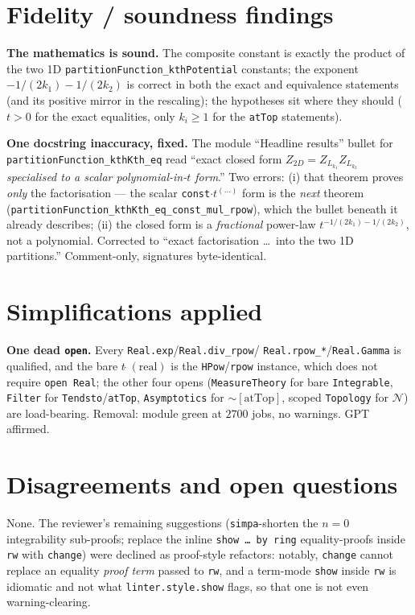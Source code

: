 \documentclass[11pt]{article}
\begin{document}
\section{Fidelity / soundness findings}
\textbf{The mathematics is sound.} The composite constant is exactly the product of the two 1D
\texttt{partitionFunction\_kthPotential} constants; the exponent $-1/(2k_1)-1/(2k_2)$ is correct in
both the exact and equivalence statements (and its positive mirror in the rescaling); the
hypotheses sit where they should ($t>0$ for the exact equalities, only $k_i\ge1$ for the
\texttt{atTop} statements).

\textbf{One docstring inaccuracy, fixed.} The module ``Headline results'' bullet for
\texttt{partitionFunction\_kthKth\_eq} read ``exact closed form $Z_{2D}=Z_{L_{k_1}}Z_{L_{k_2}}$
\emph{specialised to a scalar polynomial-in-$t$ form}.'' Two errors: (i) that theorem proves
\emph{only} the factorisation --- the scalar \texttt{const}$\cdot t^{(\dots)}$ form is the
\emph{next} theorem (\texttt{partitionFunction\_kthKth\_eq\_const\_mul\_rpow}), which the bullet
beneath it already describes; (ii) the closed form is a \emph{fractional} power-law
$t^{-1/(2k_1)-1/(2k_2)}$, not a polynomial. Corrected to ``exact factorisation \dots\ into the two
1D partitions.'' Comment-only, signatures byte-identical.

\section{Simplifications applied}
\textbf{One dead \texttt{open}.} Every \texttt{Real.exp}/\texttt{Real.div\_rpow}/%
\texttt{Real.rpow\_*}/\texttt{Real.Gamma} is qualified, and the bare $t\,\hat{}\,(\text{real})$ is
the \texttt{HPow}/\texttt{rpow} instance, which does not require \texttt{open Real}; the other four
opens (\texttt{MeasureTheory} for bare \texttt{Integrable}, \texttt{Filter} for
\texttt{Tendsto}/\texttt{atTop}, \texttt{Asymptotics} for $\sim[\mathrm{atTop}]$, scoped
\texttt{Topology} for $\mathcal N$) are load-bearing. Removal: module green at $2700$ jobs, no
warnings. GPT affirmed.

\section{Disagreements and open questions}
None. The reviewer's remaining suggestions (\texttt{simpa}-shorten the $n=0$ integrability
sub-proofs; replace the inline \texttt{show \dots\ by ring} equality-proofs inside \texttt{rw} with
\texttt{change}) were declined as proof-style refactors: notably, \texttt{change} cannot replace an
equality \emph{proof term} passed to \texttt{rw}, and a term-mode \texttt{show} inside \texttt{rw}
is idiomatic and not what \texttt{linter.style.show} flags, so that one is not even
warning-clearing.
\end{document}

